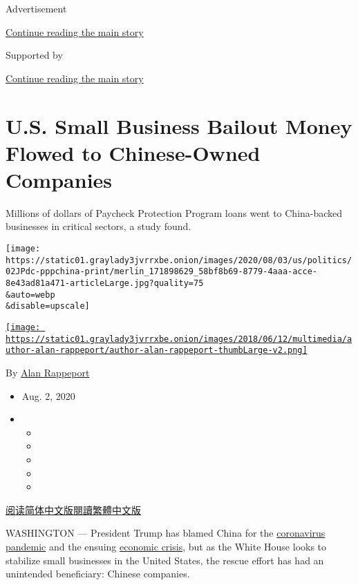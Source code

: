 Advertisement

\protect\hyperlink{after-top}{Continue reading the main story}

Supported by

\protect\hyperlink{after-sponsor}{Continue reading the main story}

\hypertarget{us-small-business-bailout-money-flowed-to-chinese-owned-companies}{%
\section{U.S. Small Business Bailout Money Flowed to Chinese-Owned
Companies}\label{us-small-business-bailout-money-flowed-to-chinese-owned-companies}}

Millions of dollars of Paycheck Protection Program loans went to
China-backed businesses in critical sectors, a study found.

\texttt{[image: https://static01.graylady3jvrrxbe.onion/images/2020/08/03/us/politics/02JPdc-pppchina-print/merlin\_171898629\_58bf8b69-8779-4aaa-acce-8e43ad81a471-articleLarge.jpg?quality=75\\\&auto=webp\\\&disable=upscale]}

\href{https://www.nytimes3xbfgragh.onion/by/alan-rappeport}{\texttt{[image: https://static01.graylady3jvrrxbe.onion/images/2018/06/12/multimedia/author-alan-rappeport/author-alan-rappeport-thumbLarge-v2.png]}}

By \href{https://www.nytimes3xbfgragh.onion/by/alan-rappeport}{Alan
Rappeport}

\begin{itemize}
\item
  Aug. 2, 2020
\item
  \begin{itemize}
  \item
  \item
  \item
  \item
  \item
  \end{itemize}
\end{itemize}

\href{https://cn.nytimes3xbfgragh.onion/usa/20200803/virus-china-ppp-small-business-loans/}{阅读简体中文版}\href{https://cn.nytimes3xbfgragh.onion/usa/20200803/virus-china-ppp-small-business-loans/zh-hant/}{閱讀繁體中文版}

WASHINGTON --- President Trump has blamed China for the
\href{https://www.nytimes3xbfgragh.onion/news-event/coronavirus}{coronavirus
pandemic} and the ensuing
\href{https://www.nytimes3xbfgragh.onion/2020/07/30/business/economy/q2-gdp-coronavirus-economy.html}{economic
crisis}, but as the White House looks to stabilize small businesses in
the United States, the rescue effort has had an unintended beneficiary:
Chinese companies.

